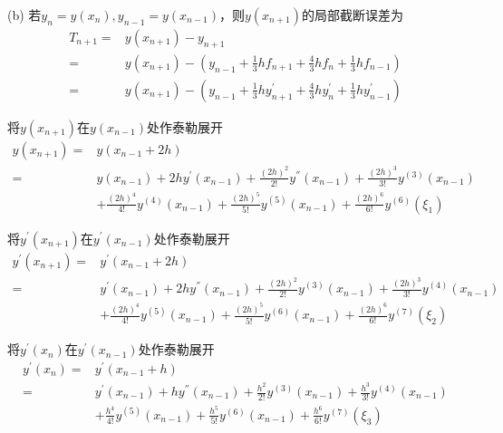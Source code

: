 \documentclass[12pt,a4paper,utf8]{ctexart}
\begin{document}
\begin{enumerate}
\subitem(b)
若$y_n=y(x_n),y_{n-1}=y(x_{n-1})$，则$y(x_{n+1})$的局部截断误差为
\begin{equation}
    \begin{aligned}
        T_{n+1}=&y(x_{n+1})-y_{n+1}\\
        =&y(x_{n+1})-(y_{n-1}+\frac{1}{3}hf_{n+1}+\frac{4}{3}hf_n+\frac{1}{3}hf_{n-1})\\
        =&y(x_{n+1})-(y_{n-1}+\frac{1}{3}hy^{'}_{n+1}+\frac{4}{3}hy^{'}_n+\frac{1}{3}hy^{'}_{n-1})
    \end{aligned}
\end{equation}

将$y(x_{n+1})$在$y(x_{n-1})$处作泰勒展开
\begin{equation}
    \begin{aligned}
        y(x_{n+1})=&y(x_{n-1}+2h)\\
        = &y(x_{n-1})+2hy^{'}(x_{n-1})+\frac{(2h)^2}{2!}y^{''}(x_{n-1})+\frac{(2h)^3}{3!}y^{(3)}(x_{n-1})\\
        &+\frac{(2h)^4}{4!}y^{(4)}(x_{n-1})+\frac{(2h)^5}{5!}y^{(5)}(x_{n-1})+\frac{(2h)^6}{6!}y^{(6)}(\xi_1)
    \end{aligned}
\end{equation}

将$y^{'}(x_{n+1})$在$y^{'}(x_{n-1})$处作泰勒展开
\begin{equation}
    \begin{aligned}
        y^{'}(x_{n+1})=&y^{'}(x_{n-1}+2h)\\
        =&y^{'}(x_{n-1})+2hy^{''}(x_{n-1})+\frac{(2h)^2}{2!}y^{(3)}(x_{n-1})+\frac{(2h)^3}{3!}y^{(4)}(x_{n-1})\\
        &+\frac{(2h)^4}{4!}y^{(5)}(x_{n-1})+\frac{(2h)^5}{5!}y^{(6)}(x_{n-1})+\frac{(2h)^6}{6!}y^{(7)}(\xi_2)
    \end{aligned}
\end{equation}

将$y^{'}(x_n)$在$y^{'}(x_{n-1})$处作泰勒展开
\begin{equation}
    \begin{aligned}
        y^{'}(x_{n})=&y^{'}(x_{n-1}+h)\\
        =&y^{'}(x_{n-1})+hy^{''}(x_{n-1})+\frac{h^2}{2!}y^{(3)}(x_{n-1})+\frac{h^3}{3!}y^{(4)}(x_{n-1})\\&+
        \frac{h^4}{4!}y^{(5)}(x_{n-1})+\frac{h^5}{5!}y^{(6)}(x_{n-1})+\frac{h^6}{6!}y^{(7)}(\xi_3)
    \end{aligned}
\end{equation}


\end{enumerate}
\end{document}
